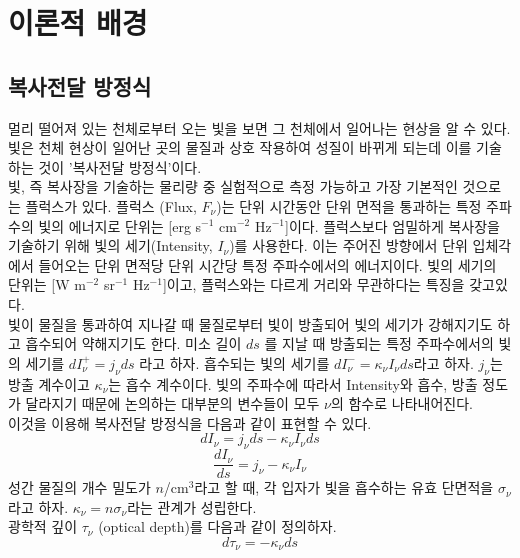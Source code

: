 \section{이론적 배경}

\subsection{복사전달 방정식}
멀리 떨어져 있는 천체로부터 오는 빛을 보면 그 천체에서 일어나는 현상을 알 수 있다. 빛은 천체 현상이 일어난 곳의 물질과 상호 작용하여 성질이 바뀌게 되는데 이를 기술하는 것이 '복사전달 방정식'이다.\\
빛, 즉 복사장을 기술하는 물리량 중 실험적으로 측정 가능하고 가장 기본적인 것으로는 플럭스가 있다. 플럭스 (Flux, $F_\nu$)는 단위 시간동안 단위 면적을 통과하는 특정 주파수의 빛의 에너지로 단위는 [erg s$^{-1}$ cm$^{-2}$ Hz$^{-1}$]이다. 플럭스보다 엄밀하게 복사장을 기술하기 위해 빛의 세기(Intensity, $I_\nu$)를 사용한다. 이는 주어진 방향에서 단위 입체각에서 들어오는 단위 면적당 단위 시간당 특정 주파수에서의 에너지이다.	빛의 세기의 단위는 [W m$^{-2}$ sr$^{-1}$ Hz$^{-1}$]이고, 플럭스와는 다르게 거리와 무관하다는 특징을 갖고있다.\\
빛이 물질을 통과하여 지나갈 때 물질로부터 빛이 방출되어 빛의 세기가 강해지기도 하고 흡수되어 약해지기도 한다. 미소 길이 $ds$ 를 지날 때 방출되는 특정 주파수에서의 빛의 세기를 $dI_{\nu} ^{+} = j_{\nu} ds$ 라고 하자. 흡수되는 빛의 세기를 $dI_{\nu} ^{-} = \kappa_{\nu} I_{\nu}ds$라고 하자. $j_{\nu}$는 방출 계수이고 $\kappa_{\nu}$는 흡수 계수이다. 빛의 주파수에 따라서 Intensity와 흡수, 방출 정도가 달라지기 때문에 논의하는 대부분의 변수들이 모두 $\nu$의 함수로 나타내어진다. \\
이것을 이용해 복사전달 방정식을 다음과 같이 표현할 수 있다. 
\begin{equation}
dI_\nu = j_{\nu}ds - \kappa_{\nu} I_{\nu}ds
\end{equation}
\begin{equation}
\frac{dI_\nu}{ds} = j_{\nu} - \kappa_{\nu} I_{\nu}
\end{equation}
성간 물질의 개수 밀도가 $n$/cm$^3$라고 할 때, 각 입자가 빛을 흡수하는 유효 단면적을 $\sigma _\nu$라고 하자. $\kappa_\nu = n \sigma _\nu$라는 관계가 성립한다.\\
광학적 깊이 $\tau_\nu$ (optical depth)를 다음과 같이 정의하자. 
\begin{equation}
d\tau_\nu = -\kappa _\nu ds
\end{equation}
